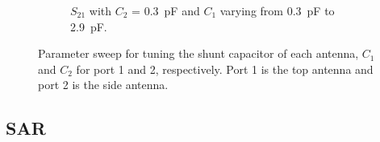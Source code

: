 \begin{figure}[htbp]
\begin{subfigure}[b]{0.49\linewidth}
        \caption{$S_{21}$ with $C_2$ = \SI{0.3}{pF} and $C_1$ varying from \SI{0.3}{pF} to \SI{2.9}{pF}.}
        \label{fig:ant1_s22}
    \end{subfigure}
    \caption{Parameter sweep for tuning the shunt capacitor of each antenna, $C_1$ and $C_2$ for port 1 and 2, respectively. Port 1 is the top antenna and port 2 is the side antenna.}
    \label{fig:sparam_mono}
\end{figure}

\subsection{SAR}

